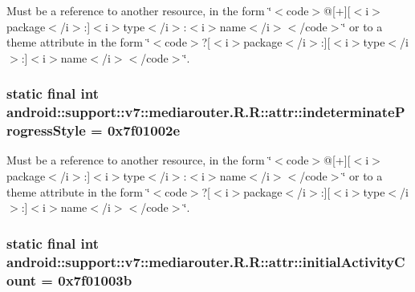 Must be a reference to another resource, in the form \char`\"{}$<$code$>$@\mbox{[}+\mbox{]}\mbox{[}$<$i$>$package$<$/i$>$:\mbox{]}$<$i$>$type$<$/i$>$:$<$i$>$name$<$/i$>$$<$/code$>$\char`\"{} or to a theme attribute in the form \char`\"{}$<$code$>$?\mbox{[}$<$i$>$package$<$/i$>$:\mbox{]}\mbox{[}$<$i$>$type$<$/i$>$:\mbox{]}$<$i$>$name$<$/i$>$$<$/code$>$\char`\"{}. \hypertarget{classandroid_1_1support_1_1v7_1_1mediarouter_1_1_r_1_1attr_9d89bf01d4de14984e7a6ca683e26832}{
\subsubsection[{indeterminateProgressStyle}]{\setlength{\rightskip}{0pt plus 5cm}static final int android::support::v7::mediarouter.R.R::attr::indeterminateProgressStyle = 0x7f01002e}}
\label{classandroid_1_1support_1_1v7_1_1mediarouter_1_1_r_1_1attr_9d89bf01d4de14984e7a6ca683e26832}


Must be a reference to another resource, in the form \char`\"{}$<$code$>$@\mbox{[}+\mbox{]}\mbox{[}$<$i$>$package$<$/i$>$:\mbox{]}$<$i$>$type$<$/i$>$:$<$i$>$name$<$/i$>$$<$/code$>$\char`\"{} or to a theme attribute in the form \char`\"{}$<$code$>$?\mbox{[}$<$i$>$package$<$/i$>$:\mbox{]}\mbox{[}$<$i$>$type$<$/i$>$:\mbox{]}$<$i$>$name$<$/i$>$$<$/code$>$\char`\"{}. \hypertarget{classandroid_1_1support_1_1v7_1_1mediarouter_1_1_r_1_1attr_bc73a238a622f244fdd0c2e2ab471cdf}{
\subsubsection[{initialActivityCount}]{\setlength{\rightskip}{0pt plus 5cm}static final int android::support::v7::mediarouter.R.R::attr::initialActivityCount = 0x7f01003b}}
\label{classandroid_1_1support_1_1v7_1_1mediarouter_1_1_r_1_1attr_bc73a238a622f244fdd0c2e2ab471cdf}


